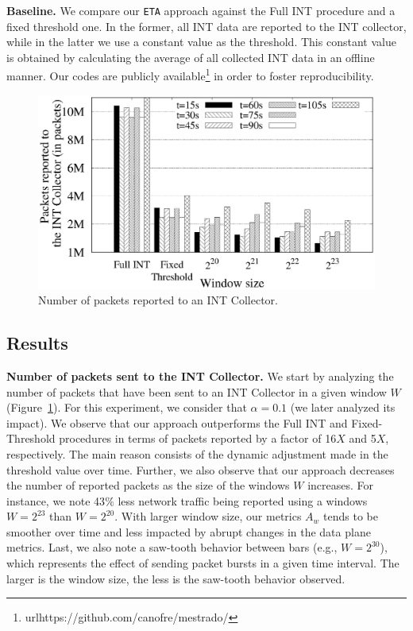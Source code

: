 \noindent\textbf{Baseline.} We compare our \texttt{ETA} approach against the Full INT procedure and a fixed threshold one. In the former, all INT data are reported to the INT collector, while in the latter we use a constant value as the threshold. This constant value is obtained by calculating the average of all collected INT data in an offline manner. Our codes are publicly available\footnote{url{https://github.com/canofre/mestrado/}} in order to foster reproducibility.

\begin{figure}[!htb]
\centering
\includegraphics[scale=0.38]{results/g1a.eps}
\caption{Number of packets reported to an INT Collector.} 
\label{fig-results1}
\end{figure}

\subsection{Results}

\noindent \textbf{Number of packets sent to the INT Collector.} We start by analyzing the number of packets that have been sent to an INT Collector in a given window $W$ (Figure~\ref{fig-results1}). For this experiment, we consider that $\alpha = 0.1$ (we later analyzed its impact). We observe that our approach outperforms the Full INT and Fixed-Threshold procedures in terms of packets reported by a factor of 16$X$ and 5$X$, respectively. The main reason consists of the dynamic adjustment made in the threshold value over time. Further, we also observe that our approach decreases the number of reported packets as the size of the windows $W$ increases. For instance, we note 43$\%$ less network traffic being reported using a windows $W=2^{23}$ than $W=2^{20}$. With larger window size, our metrics $A_w$ tends to be smoother over time and less impacted by abrupt changes in the data plane metrics. Last, we also note a saw-tooth behavior between bars (e.g., $W=2^{30}$), which represents the effect of sending packet bursts in a given time interval. The larger is the window size, the less is the saw-tooth behavior observed.\\ 



